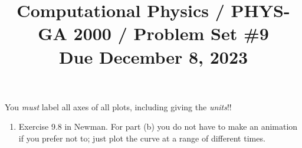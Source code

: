 \documentclass[11pt, preprint]{aastex}
\begin{document}
\title{\bf Computational Physics / PHYS-GA 2000 / Problem Set \#9
\\ Due December 8, 2023 }

You {\it must} label all axes of all plots, including giving the {\it
  units}!!

\begin{enumerate} 
\item Exercise 9.8 in Newman. For part (b) you do not have to make an
  animation if you prefer not to; just plot the curve at a range of
  different times.
\end{enumerate} 
\end{document}
